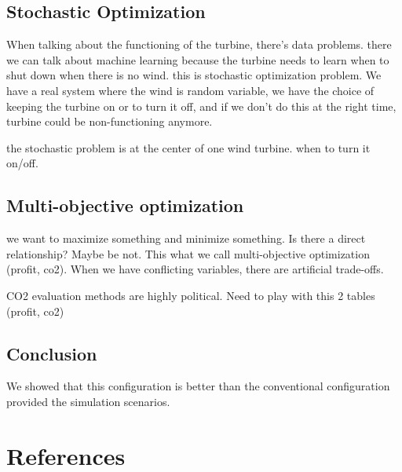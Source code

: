\documentclass[12pt]{article}
\begin{document}
\subsection{Stochastic Optimization}
When talking about the functioning of the turbine, there's data problems.
there we can talk about machine learning because the turbine needs to learn when to shut down when there is no wind. this is stochastic optimization problem. We have a real 
system where the wind is random variable, we have the choice of keeping the turbine on or to turn it off, and if we don't do this at the right time, turbine could be non-functioning anymore. 

the stochastic problem is at the center of one wind turbine. when to turn it on/off.

\subsection{Multi-objective optimization}
we want to maximize something and minimize something. Is there a direct relationship?
Maybe be not. This what we call multi-objective optimization (profit, co2). When we have conflicting variables, there are artificial trade-offs. 

CO2 evaluation methods are highly political. Need to play with this 2 tables (profit, co2)

\subsection{Conclusion}
We showed that this configuration is better than the conventional configuration provided the simulation scenarios. 

 



\section{References}
\end{document}
